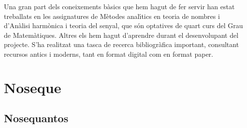 \documentclass[11pt,a4paper,openright,oneside]{book}
\numberwithin{equation}{section}
\begin{document}
Una gran part dels coneixements b\`asics que hem hagut de fer servir han estat treballats en les assignatures de M\`etodes anal\'{\i}tics en teoria de nombres i d'An\`alisi harm\`onica i teoria del senyal, que s\'on optatives de quart curs del Grau de Ma\-te\-m\`a\-ti\-ques. Altres els hem hagut d'aprendre durant el desenvolupant del projecte. S'ha realitzat una tasca de recerca bibliogr\`afica important, consultant recursos antics i moderns, tant en format digital com en format paper.

\normalfont


\newpage

\printbibliography

\appendix
\chapter{Noseque}
\section{Nosequantos}
\end{document}
